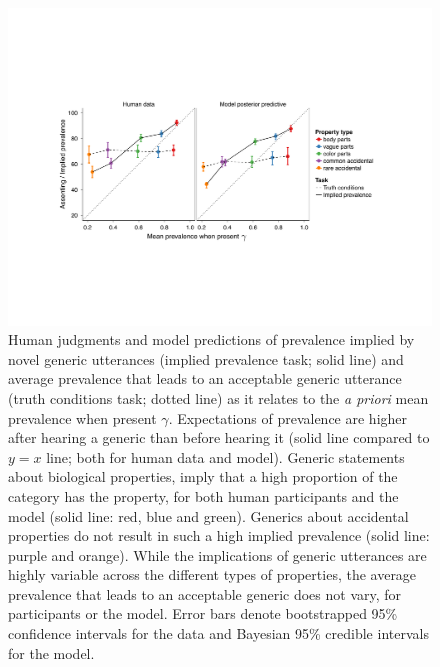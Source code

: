 \documentclass{pnastwo}
\begin{document}
\begin{figure}
\centering
    \includegraphics[width=\columnwidth]{asym-lines-data-model-2phi-2so-50kx3.pdf}
    \caption{Human judgments and model predictions of prevalence implied by novel generic utterances (implied prevalence task; solid line) and average prevalence that leads to an acceptable generic utterance (truth conditions task; dotted line) as it relates to the \emph{a priori} mean prevalence when present $\gamma$.
    Expectations of prevalence are higher after hearing a generic than before hearing it (solid line compared to $y=x$ line; both for human data and model).
    Generic statements about biological properties, imply that a high proportion of the category has the property, for both human participants and the model (solid line: red, blue and green). 
    Generics about accidental properties do not result in such a high implied prevalence (solid line: purple and orange).  
	While the implications of generic utterances are highly variable across the different types of properties, the average prevalence that leads to an acceptable generic does not vary, for participants or the model.
    Error bars denote bootstrapped 95\% confidence intervals for the data and Bayesian 95\% credible intervals for the model.
}
  \label{fig:exp2b}
\end{figure}
\end{document}
